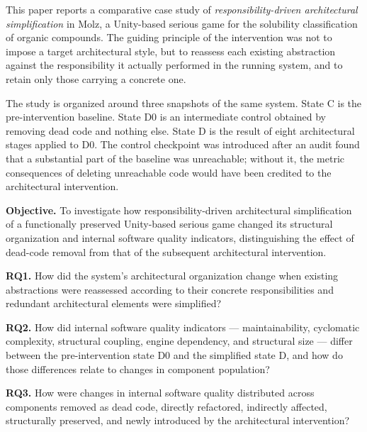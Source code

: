 \documentclass{sbc2019}%
\begin{document}
This paper reports a comparative case study of \emph{responsibility-driven
architectural simplification} in Molz, a Unity-based serious game for the
solubility classification of organic compounds. The guiding principle of the
intervention was not to impose a target architectural style, but to reassess
each existing abstraction against the responsibility it actually performed in
the running system, and to retain only those carrying a concrete one.

The study is organized around three snapshots of the same system. State C is
the pre-intervention baseline. State D0 is an intermediate control obtained by
removing dead code and nothing else. State D is the result of eight
architectural stages applied to D0. The control checkpoint was introduced after
an audit found that a substantial part of the baseline was unreachable; without
it, the metric consequences of deleting unreachable code would have been
credited to the architectural intervention.

\medskip\noindent\textbf{Objective.} To investigate how responsibility-driven
architectural simplification of a functionally preserved Unity-based serious
game changed its structural organization and internal software quality
indicators, distinguishing the effect of dead-code removal from that of the
subsequent architectural intervention.

\medskip\noindent\textbf{RQ1.} How did the system's architectural organization
change when existing abstractions were reassessed according to their concrete
responsibilities and redundant architectural elements were simplified?

\medskip\noindent\textbf{RQ2.} How did internal software quality indicators ---
maintainability, cyclomatic complexity, structural coupling, engine dependency,
and structural size --- differ between the pre-intervention state D0 and the
simplified state D, and how do those differences relate to changes in component
population?

\medskip\noindent\textbf{RQ3.} How were changes in internal software quality
distributed across components removed as dead code, directly refactored,
indirectly affected, structurally preserved, and newly introduced by the
architectural intervention?

\medskip
\end{document}
